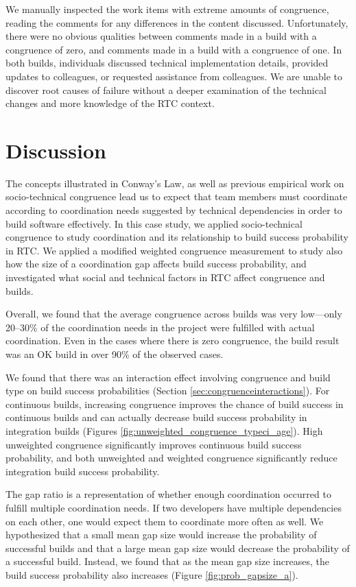 We manually inspected the work items with extreme amounts of congruence, reading the comments for any differences in the content discussed. Unfortunately, there were no obvious qualities between comments made in a build with a congruence of zero, and comments made in a build with a congruence of one. In both builds, individuals discussed technical implementation details, provided updates to colleagues, or requested assistance from colleagues. We are unable to discover root causes of failure without a deeper examination of the technical changes and more knowledge of the RTC context.


\section{Discussion}
\label{sec:discussion}
The concepts illustrated in Conway's Law, as well as previous empirical work on socio-technical congruence lead us to expect that team members must coordinate according to coordination needs suggested by technical dependencies in order to build software effectively.
In this case study, we applied socio-technical congruence to study coordination and its relationship to build success probability in RTC. We applied a modified weighted congruence measurement to study also how the size of a coordination gap affects build success probability, and investigated what social and technical factors in RTC affect congruence and builds.

Overall, we found that the average congruence across builds was very low---only 20--30\% of the coordination needs in the project were fulfilled with actual coordination. Even in the cases where there is zero congruence, the build result was an OK build in over 90\% of the observed cases.

We found that there was an interaction effect involving congruence and build type on build success probabilities (Section \ref{sec:congruenceinteractions}). For continuous builds, increasing congruence improves the chance of build success in continuous builds and can actually decrease build success probability in integration builds (Figures \ref{fig:unweighted_congruence_typeci_age}). High unweighted congruence significantly improves continuous build success probability, and both unweighted and weighted congruence significantly reduce integration build success probability.

The gap ratio is a representation of whether enough coordination
occurred to fulfill multiple coordination needs. If two developers have multiple dependencies on each other, one would expect them to
coordinate more often as well.
We hypothesized that a small mean gap size would increase the probability of successful builds and that a large mean gap size would decrease the probability of a successful build. Instead, we found that as the mean gap size increases, the build success probability also increases (Figure \ref{fig:prob_gapsize_a}).

